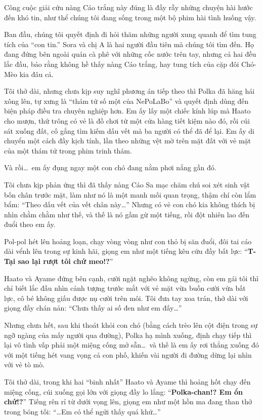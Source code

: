 \documentclass[../main.tex]{subfiles}
\begin{document}
Công cuộc giải cứu nàng Cáo trắng này đúng là đầy rẫy những chuyện hài hước đến khó tin, như thể chúng tôi đang sống trong một bộ phim hài tình huống vậy.

Ban đầu, chúng tôi quyết định đi hỏi thăm những người xung quanh để tìm tung tích của ``con tin.'' Sora và chị A là hai người đầu tiên mà chúng tôi tìm đến. Họ đang đứng bên ngoài quán cà phê với những cốc nước trên tay, nhưng cả hai đều lắc đầu, bảo rằng không hề thấy nàng Cáo trắng, hay tung tích của cặp đôi Chó-Mèo kia đâu cả.

Tôi thở dài, nhưng chưa kịp suy nghĩ phương án tiếp theo thì Polka đã hăng hái xông lên, tự xưng là ``thám tử số một của NePoLaBo'' và quyết định dùng đến biện pháp điều tra chuyên nghiệp hơn. Em ấy lấy một chiếc kính lúp mà Haato cho mượn, thứ trông có vẻ là đồ chơi từ một cửa hàng tiết kiệm nào đó, rồi cúi sát xuống đất, cố gắng tìm kiếm dấu vết mà ba người có thể đã để lại. Em ấy di chuyển một cách đầy kịch tính, lần theo những vệt mờ trên mặt đất với vẻ mặt của một thám tử trong phim trinh thám.

Và rồi\dots\ em ấy đụng ngay một con chó đang nằm phơi nắng gần đó.

Tôi chưa kịp phản ứng thì đã thấy nàng Cáo Sa mạc chăm chú soi xét sinh vật bốn chân trước mặt, làm như nó là một manh mối quan trọng, thậm chí còn lẩm bẩm: ``Theo dấu vết của vết chân này\dots'' Nhưng có vẻ con chó kia không thích bị nhìn chằm chằm như thế, và thế là nó gầm gừ một tiếng, rồi đột nhiên lao đến đuổi theo em ấy.

Pol-pol hét lên hoảng loạn, chạy vòng vòng như con thỏ bị săn đuổi, đôi tai cáo dài vểnh lên trong sự kinh hãi, giọng em như một tiếng kêu cứu đầy bất lực: ``\textbf{T-Tại sao lại rượt tôi chứ meo!?}''

Haato và Ayame đứng bên cạnh, cười ngặt nghẽo không ngừng, còn em gái tôi thì chỉ biết lắc đầu nhìn cảnh tượng trước mắt với vẻ mặt vừa buồn cười vừa bất lực, cô bé không giấu được nụ cười trên môi. Tôi đưa tay xoa trán, thở dài với giọng đầy chán nản: ``Chưa thấy ai số đen như em đấy\dots''

Nhưng chưa hết, sau khi thoát khỏi con chó (bằng cách trèo lên cột điện trong sự ngỡ ngàng của mấy người qua đường), Polka hạ mình xuống, định chạy tiếp thì lại vô tình vấp phải một miệng cống mở sẵn\dots\ và thế là em ấy rơi thẳng xuống đó với một tiếng hét vang vọng cả con phố, khiến vài người đi đường dừng lại nhìn với vẻ tò mò.

Tôi thở dài, trong khi hai ``binh nhất'' Haato và Ayame thì hoảng hốt chạy đến miệng cống, cúi xuống gọi lớn với giọng đầy lo lắng: ``\textbf{Polka-chan!? Em ổn chứ!?}'' Tiếng rên rỉ từ dưới vọng lên, giọng em như một hồn ma đang than thở trong bóng tối: ``\dots Em có thể ngửi thấy quá khứ\dots''
\end{document}
